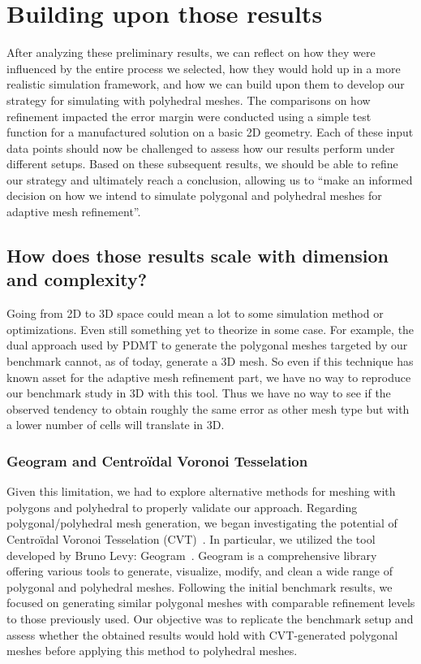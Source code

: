 \documentclass{article}
\begin{document}
\section{Building upon those results}
After analyzing these preliminary results, we can reflect on how they were influenced by the entire process we selected, how they would hold up in a more realistic simulation framework, and how we can build upon them to develop our strategy for simulating with polyhedral meshes. The comparisons on how refinement impacted the error margin were conducted using a simple test function for a manufactured solution on a basic 2D geometry. Each of these input data points should now be challenged to assess how our results perform under different setups. Based on these subsequent results, we should be able to refine our strategy and ultimately reach a conclusion, allowing us to ``make an informed decision on how we intend to simulate polygonal and polyhedral meshes for adaptive mesh refinement''.

\subsection{How does those results scale with dimension and complexity?}
Going from 2D to 3D space could mean a lot to some simulation method or optimizations. Even still something yet to theorize in some case. For example, the dual approach used by PDMT to generate the polygonal meshes targeted by our benchmark cannot, as of today, generate a 3D mesh. So even if this technique has known asset for the adaptive mesh refinement part, we have no way to reproduce our benchmark study in 3D with this tool. Thus we have no way to see if the observed tendency to obtain roughly the same error as other mesh type but with a lower number of cells will translate in 3D.

\subsubsection{Geogram and Centroïdal Voronoi Tesselation}
Given this limitation, we had to explore alternative methods for meshing with polygons and polyhedral to properly validate our approach. Regarding polygonal/polyhedral mesh generation, we began investigating the potential of Centroïdal Voronoi Tesselation (CVT)~\cite{doi:10.1137/S0036144599352836}. In particular, we utilized the tool developed by Bruno Levy: Geogram~\cite{levy2015geogram}. Geogram is a comprehensive library offering various tools to generate, visualize, modify, and clean a wide range of polygonal and polyhedral meshes. Following the initial benchmark results, we focused on generating similar polygonal meshes with comparable refinement levels to those previously used. Our objective was to replicate the benchmark setup and assess whether the obtained results would hold with CVT-generated polygonal meshes before applying this method to polyhedral meshes.
\end{document}

